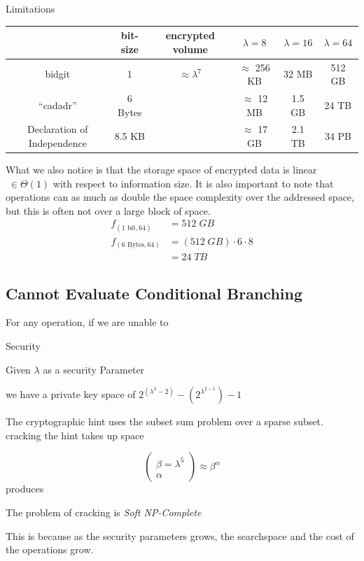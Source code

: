 \documentclass[a0,portrait]{a0poster}
\begin{document}
\begin{multicols}{2}
\begin{slide}{Limitations}
  \vspace{1em}
  \begin{center}
  \begin{tabular}{c|c|c|c|c|c}
     & {\small bit-size} &  {\small encrypted volume}  & \(\lambda = 8\) & \(\lambda = 16\) & \(\lambda = 64\) \\\hline 
    {\small bidgit} & 1 & \(\approx \lambda^7 \) & \(\approx\) 256 KB & 32 MB & 512 GB \\\hline
    {\small ``cadadr''} & 6 Bytes & & \(\approx\) 12 MB & 1.5 GB & 24 TB \\\hline
    {\small Declaration of Independence} & 8.5 KB & & \(\approx\) 17 GB & 2.1 TB & 34 PB\\
  \end{tabular}
  \end{center}
  \vspace{1em}

  What we also notice is that the storage space of encrypted data is linear \(\;\in\Theta(1)\) with respect to information size.  It is also important to note that operations can as much as double the space complexity over the addressed space, but this is often not over a large block of space.
\begin{align*}
f_{(1\text{ bit},64)}&=512\; GB\\
f_{(6\text{ Bytes},64)}&=(512\; GB)\cdot6\cdot 8\\&=24\; TB
\end{align*}

\subsection*{Cannot Evaluate Conditional Branching}
For any operation, if we are unable to 

\end{slide}

\begin{slide}{Security}

Given \(\lambda\) as a security Parameter 

we have a private key space of \(2^{(\lambda^2-2)} - (2^{\lambda^{2-1}})-1\)

The cryptographic hint uses the subset sum problem over a sparse subset. cracking the hint takes up space 

\[\left(\begin{matrix}\beta = \lambda^5\\\alpha \end{matrix}\right)\approx \beta^\alpha\] produces


The problem of cracking is {\em Soft NP-Complete}

This is because as the security parameters grows, the searchspace and the cost of the operations grow. 
\end{slide}

\end{multicols}
\end{document}
